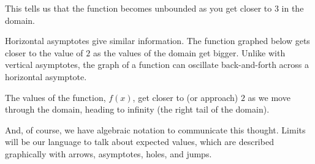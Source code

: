 \documentclass{ximera}
\begin{document}
This tells us that the function becomes unbounded as you get closer to $3$ in the domain. 




Horizontal asymptotes give similar information.  The function graphed below gets closer to the value of $2$ as the values of the domain get bigger.   Unlike with vertical asymptotes, the graph of a function can oscillate back-and-forth across a horizontal asymptote.




\begin{image}
\end{image}


The values of the function, $f(x)$, get closer to (or approach) $2$ as we move through the domain, heading to infinity (the right tail of the domain).  

And, of course, we have algebraic notation to communicate this thought. Limits will be our language to talk about expected values, which are described graphically with arrows, asymptotes, holes, and jumps.
\end{document}
